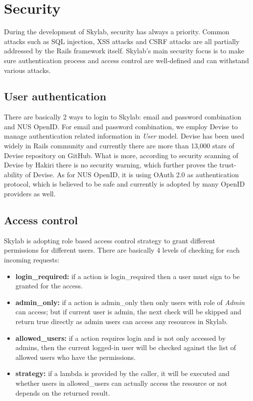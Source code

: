\chapter{Security} \label{security}

During the development of Skylab, security has always a priority. Common attacks such as SQL injection, XSS attacks and CSRF attacks are all partially addressed by the Rails framework itself. Skylab's main security focus is to make sure authentication process and access control are well-defined and can withstand various attacks.

\section{User authentication}

There are basically 2 ways to login to Skylab: email and password combination and NUS OpenID. For email and password combination, we employ Devise to manage authentication related information in \textit{User} model. Devise has been used widely in Rails community and currently there are more than 13,000 stars of Devise repository on GitHub\cite{citationdevise}. What is more, according to security scanning of Devise by Hakiri there is no security warning, which further proves the trust-ability of Devise\cite{citationdevisehakiri}. As for NUS OpenID, it is using OAuth 2.0 as authentication protocol, which is believed to be safe and currently is adopted by many OpenID providers as well\cite{citationnusopenid}.

\section{Access control}

Skylab is adopting role based access control strategy to grant different permissions for different users. There are basically 4 levels of checking for each incoming requests:

\begin{itemize}
  \item \textbf{login\_required:} if a action is login\_required then a user must sign to be granted for the access.
  \item \textbf{admin\_only:} if a action is admin\_only then only users with role of \textit{Admin} can access; but if current user is admin, the next check will be skipped and return true directly as admin users can access any resources in Skylab.
  \item \textbf{allowed\_users:} if a action requires login and is not only accessed by admins, then the current logged-in user will be checked against the list of allowed users who have the permissions.
  \item \textbf{strategy:} if a lambda is provided by the caller, it will be executed and whether users in allowed\_users can actually access the resource or not depends on the returned result.
\end{itemize}

